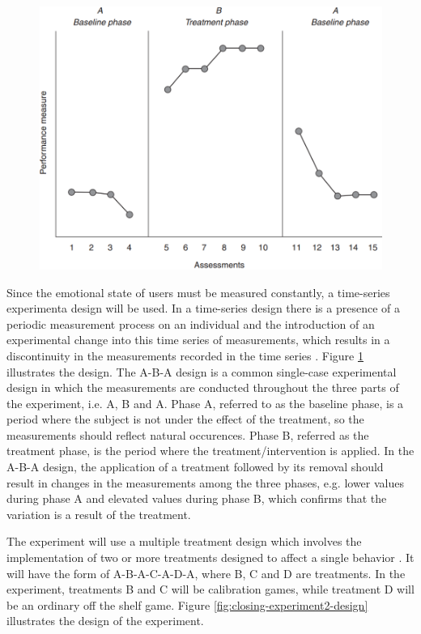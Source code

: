 \begin{figure}[ht]
    \centering
    \includegraphics[scale=0.5]{figures/time-series-design-breakwell.png}
    \caption{\textcite{breakwell1994research}}
    \label{fig:time-series-design-breakwell}
\end{figure}

Since the emotional state of users must be measured constantly, a time-series experimenta design will be used. In a time-series design there is a presence of a periodic measurement process on an individual and the introduction of an experimental change into this time series of measurements, which results in a discontinuity in the measurements recorded in the time series \textcite{campbell2015experimental}. Figure \ref{fig:time-series-design-breakwell} illustrates the design. The A-B-A design is a common single-case experimental design in which the measurements are conducted throughout the three parts of the experiment, i.e. A, B and A. Phase A, referred to as the baseline phase, is a period where the subject is not under the effect of the treatment, so the measurements should reflect natural occurences. Phase B, referred as the treatment phase, is the period where the treatment/intervention is applied. In the A-B-A design, the application of a treatment followed by its removal should result in changes in the measurements among the three phases, e.g. lower values during phase A and elevated values during phase B, which confirms that the variation is a result of the treatment.

The experiment will use a multiple treatment design which involves the implementation of two or more treatments designed to affect a single behavior \parencite{robson2016real}. It will have the form of A-B-A-C-A-D-A, where B, C and D are treatments. In the experiment, treatments B and C will be calibration games, while treatment D will be an ordinary off the shelf game. Figure \ref{fig:closing-experiment2-design} illustrates the design of the experiment.

